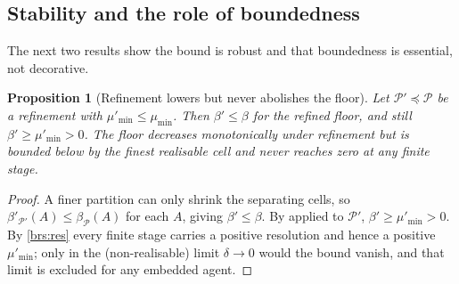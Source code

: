 \documentclass[11pt,twocolumn,a4paper]{article}
\theoremstyle{thmstyle}
\newtheorem{proposition}[theorem]{Proposition}
\theoremstyle{definition}
\theoremstyle{remark}
\newcommand{\thick}{\beta}
\newcommand{\reso}{\delta}
\newcommand{\Part}{\mathscr{P}}
\begin{document}
\subsection{Stability and the role of boundedness}

The next two results show the bound is robust and that boundedness is essential,
not decorative.

\begin{proposition}[Refinement lowers but never abolishes the floor]
\label{prop:refine}
Let $\Part'\preceq\Part$ be a refinement with $\mu'_{\min}\le\mu_{\min}$. Then
$\thick'\le\thick$ for the refined floor, and still $\thick'\ge\mu'_{\min}>0$.
The floor decreases monotonically under refinement but is bounded below by the
finest realisable cell and never reaches zero at any finite stage.
\end{proposition}

\begin{proof}
A finer partition can only shrink the separating cells, so
$\thick'_{\Part'}(A)\le\thick_\Part(A)$ for each $A$, giving $\thick'\le\thick$.
By  applied to $\Part'$, $\thick'\ge\mu'_{\min}>0$. By
\ref{brs:res} every finite stage carries a positive resolution and hence a
positive $\mu'_{\min}$; only in the (non-realisable) limit $\reso\to0$ would the
bound vanish, and that limit is excluded for any embedded agent.
\end{proof}
\end{document}
